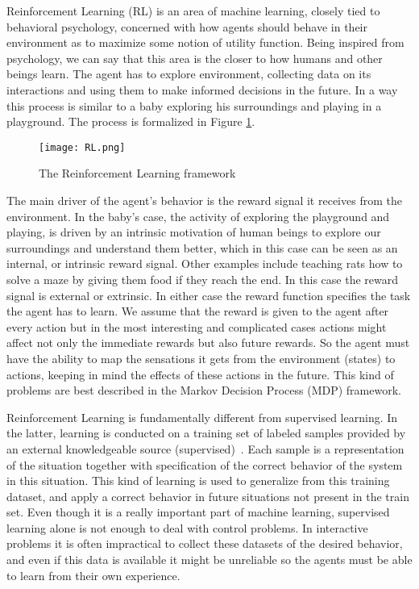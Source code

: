 Reinforcement Learning (RL) is an area of machine learning, closely tied to behavioral psychology, concerned with how agents should behave in their environment as to maximize some notion of utility function. Being inspired from psychology, we can say that this area is the closer to how humans and other beings learn.  The agent has to explore  environment, collecting data on its interactions and using them to make informed decisions in the future. In a way this process is similar to a baby exploring his surroundings and playing in a playground. The process is formalized in Figure \ref{fig:rl_framework}.\par
\begin{figure}
  \texttt{[image: RL.png]}
  \caption{The Reinforcement Learning framework ~\cite{Sutton:1998:IRL:551283}}
  \label{fig:rl_framework}
\end{figure}
The main driver of the agent's behavior is the reward signal it receives from the environment.  In the baby's case, the activity of exploring the playground and playing, is driven by an intrinsic motivation of human beings to explore our surroundings and understand them better, which in this case can be seen as an internal, or intrinsic reward signal. Other examples include teaching rats how to solve a maze by giving them food if they reach the end. In this case the reward signal is external or extrinsic. In either case the reward function  specifies the task the agent has to learn. We assume that the reward is given to the agent after every action but in the most interesting and complicated cases actions might affect not only the immediate rewards but also future rewards. So the agent must have the ability to map the sensations it gets from the environment (states) to actions, keeping in mind the effects of these actions in the future. This kind of problems are best described in the Markov Decision Process (MDP) framework.\par
Reinforcement Learning is fundamentally different from supervised learning. In the latter, learning is conducted on a training set of labeled samples provided by an external knowledgeable source (supervised)~\cite{hastie_09_elements-of.statistical-learning}. Each sample is a representation of the situation together with specification of the correct behavior of the system in this situation. This kind of learning is used to generalize from this training dataset, and apply a correct behavior in future situations not present in the train set. Even though it is a really important part of machine learning, supervised learning alone is not enough to deal with control problems. In interactive problems it is often impractical to collect these datasets of the desired behavior, and even if this data is available it might be unreliable so the agents must be able to learn from their own experience. \par
